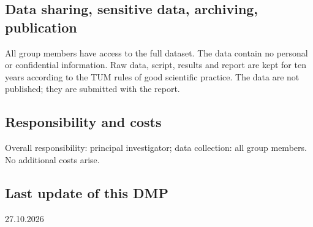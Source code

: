 \documentclass[11pt,a4paper]{article}
\begin{document}
\subsection*{Data sharing, sensitive data, archiving, publication}
All group members have access to the full dataset. The data contain no
personal or confidential information. Raw data, script, results and report
are kept for ten years according to the TUM rules of good scientific
practice. The data are not published; they are submitted with the report.

\subsection*{Responsibility and costs}
Overall responsibility: principal investigator; data collection: all group
members. No additional costs arise.

\subsection*{Last update of this DMP}
27.10.2026
\end{document}

